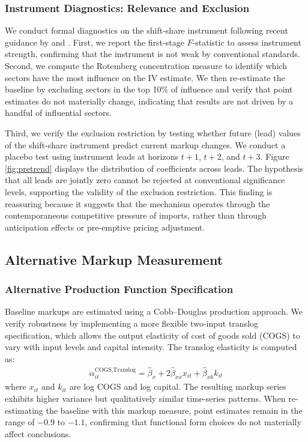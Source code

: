 \documentclass[12pt]{article}
\begin{document}
\subsubsection{Instrument Diagnostics: Relevance and Exclusion}

We conduct formal diagnostics on the shift-share instrument following recent guidance by \cite{borusyakQuasiExperimentalShiftShareResearch2022} and \cite{goldsmith-pinkhamBartikInstrumentsWhat2020}. First, we report the first-stage $F$-statistic to assess instrument strength, confirming that the instrument is not weak by conventional standards. Second, we compute the Rotemberg concentration measure to identify which sectors have the most influence on the IV estimate. We then re-estimate the baseline by excluding sectors in the top 10\% of influence and verify that point estimates do not materially change, indicating that results are not driven by a handful of influential sectors.

Third, we verify the exclusion restriction by testing whether future (lead) values of the shift-share instrument predict current markup changes. We conduct a placebo test using instrument leads at horizons $t+1$, $t+2$, and $t+3$. Figure \ref{fig:pretrend} displays the distribution of coefficients across leads. The hypothesis that all leads are jointly zero cannot be rejected at conventional significance levels, supporting the validity of the exclusion restriction. This finding is reassuring because it suggests that the mechanism operates through the contemporaneous competitive pressure of imports, rather than through anticipation effects or pre-emptive pricing adjustment.

\subsection{Alternative Markup Measurement}

\subsubsection{Alternative Production Function Specification}

Baseline markups are estimated using a Cobb--Douglas production approach. We verify robustness by implementing a more flexible two-input translog specification, which allows the output elasticity of cost of goods sold (COGS) to vary with input levels and capital intensity. The translog elasticity is computed as:
\begin{align}
\alpha_{it}^{\text{COGS,Translog}} = \hat{\beta}_x + 2\hat{\beta}_{xx} x_{it} + \hat{\beta}_{xk} k_{it}
\end{align}
where $x_{it}$ and $k_{it}$ are log COGS and log capital. The resulting markup series exhibits higher variance but qualitatively similar time-series patterns. When re-estimating the baseline with this markup measure, point estimates remain in the range of $-0.9$ to $-1.1$, confirming that functional form choices do not materially affect conclusions.
\end{document}
